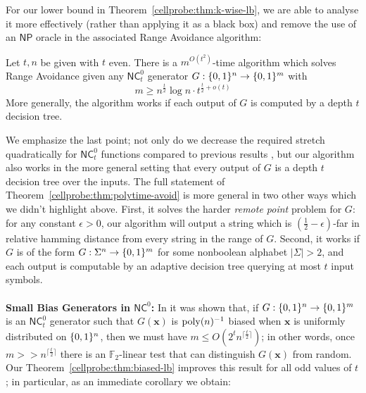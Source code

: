 For our lower bound in Theorem~\ref{cellprobe:thm:k-wise-lb}, we are able to analyse it more effectively (rather than applying it as a black box) and remove the use of an $\mathsf{NP}$ oracle in the associated Range Avoidance algorithm:

\begin{theorem}
\label{cellprobe:thm:polytime-avoid}
Let $t,n$ be given with $t$ even. There is a $m^{O(t^2)}$-time algorithm which solves Range Avoidance given any $\mathsf{NC}^0_t$ generator $G: \{0,1\}^n \to \{0,1\}^m$ with
\[
m \geq  n^{\frac{t}{2}} \log n \cdot t^{\frac{t}{2} + o(t)}
\]
More generally, the algorithm works if each output of $G$ is computed by a depth $t$ decision tree.
\end{theorem}
We emphasize the last point; not only do we decrease the required stretch quadratically for $\mathsf{NC}^0_t$ functions compared to previous results \cite{guruswami2022range,karthik}, but our algorithm also works in the more general setting that every output of $G$ is a depth $t$ decision tree over the inputs. The full statement of Theorem~\ref{cellprobe:thm:polytime-avoid} is more general in two other ways which we didn't highlight above. First, it solves the harder \emph{remote point} problem for $G$: for any constant $\epsilon>0$, our algorithm will output a string which is $(\frac{1}{2}-\epsilon)$-far in relative hamming distance from every string in the range of $G$. Second, it works if $G$ is of the form $G: \Sigma^n \to \{0,1\}^m$ for some nonboolean alphabet $|\Sigma|>2$, and each output is computable by an adaptive decision tree querying at most $t$ input symbols.
~\\~\\
{\bf \noindent Small Bias Generators in $\mathsf{NC}^0$:} In \cite{mossel-epsilon} it was shown that, if $G: \{0,1\}^n \to \{0,1\}^m$ is an $\mathsf{NC}^0_t$ generator such that $G(\bm{x})$ is $\mathrm{poly}(n)^{-1}$ biased when $\bm{x}$ is uniformly distributed on $\{0,1\}^n$, then we must have $m \leq O(2^tn^{\lceil \frac{t}{2}\rceil })$; in other words, once $m >> n^{\lceil \frac{t}{2} \rceil}$ there is an $\mathbb{F}_2$-linear test that can distinguish $G(\bm{x})$ from random. Our Theorem~\ref{cellprobe:thm:biased-lb} improves this result for all odd values of $t$; in particular, as an immediate corollary we obtain:

